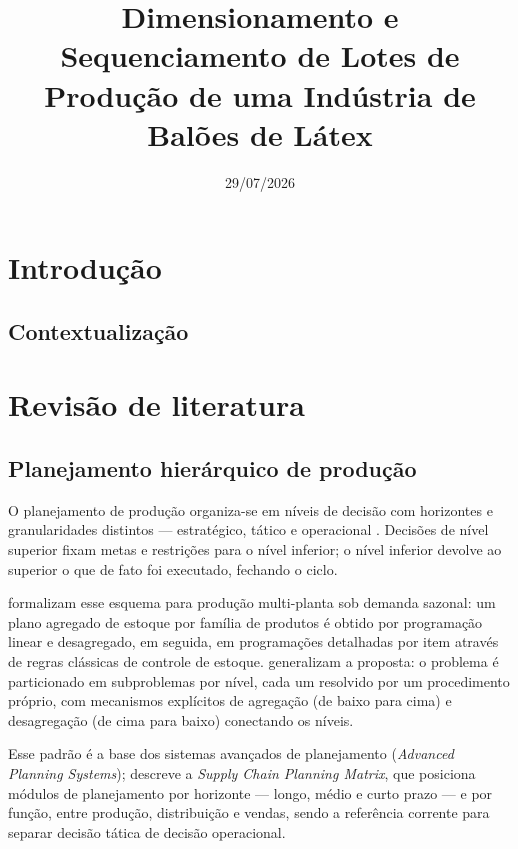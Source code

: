 \documentclass[fleqn,12pt,a4paper]{article}
\title{Dimensionamento e Sequenciamento de Lotes de Produção de uma Indústria de Balões de Látex}
\author{}
\date{29/07/2026}
\begin{document}
\maketitle

\newpage

\section{Introdução}

\subsection{Contextualização}

\newpage

\section{Revisão de literatura}

\subsection{Planejamento hierárquico de produção}

O planejamento de produção organiza-se em níveis de decisão com horizontes e granularidades distintos --- estratégico, tático e operacional \cite{anthony1965}. Decisões de nível superior fixam metas e restrições para o nível inferior; o nível inferior devolve ao superior o que de fato foi executado, fechando o ciclo.

 formalizam esse esquema para produção multi-planta sob demanda sazonal: um plano agregado de estoque por família de produtos é obtido por programação linear e desagregado, em seguida, em programações detalhadas por item através de regras clássicas de controle de estoque.  generalizam a proposta: o problema é particionado em subproblemas por nível, cada um resolvido por um procedimento próprio, com mecanismos explícitos de agregação (de baixo para cima) e desagregação (de cima para baixo) conectando os níveis.

Esse padrão é a base dos sistemas avançados de planejamento (\textit{Advanced Planning Systems});  descreve a \textit{Supply Chain Planning Matrix}, que posiciona módulos de planejamento por horizonte --- longo, médio e curto prazo --- e por função, entre produção, distribuição e vendas, sendo a referência corrente para separar decisão tática de decisão operacional.
\end{document}
